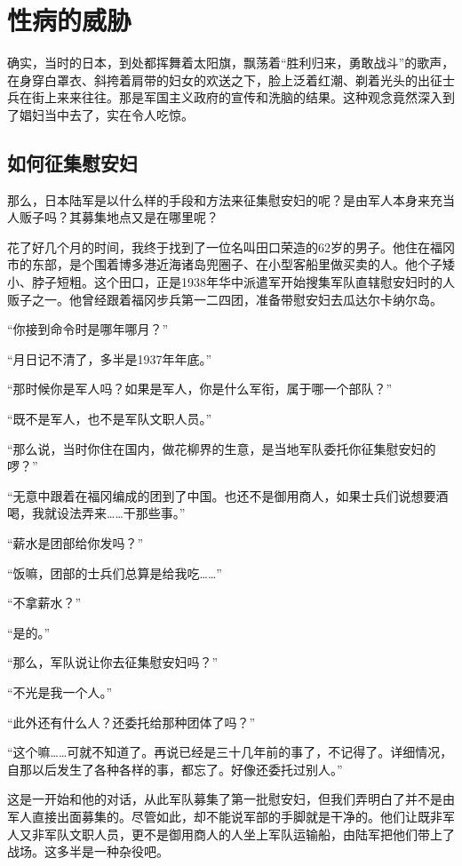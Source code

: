 \documentclass[12pt,UTF8]{ctexbook}
\begin{document}
\chapter{性病的威胁}

确实，当时的日本，到处都挥舞着太阳旗，飘荡着“胜利归来，勇敢战斗”的歌声，在身穿白罩衣、斜挎着肩带的妇女的欢送之下，脸上泛着红潮、剃着光头的出征士兵在街上来来往往。那是军国主义政府的宣传和洗脑的结果。这种观念竟然深入到了娼妇当中去了，实在令人吃惊。

\section{如何征集慰安妇}

那么，日本陆军是以什么样的手段和方法来征集慰安妇的呢？是由军人本身来充当人贩子吗？其募集地点又是在哪里呢？

花了好几个月的时间，我终于找到了一位名叫田口荣造的62岁的男子。他住在福冈市的东部，是个围着博多港近海诸岛兜圈子、在小型客船里做买卖的人。他个子矮小、脖子短粗。这个田口，正是1938年华中派遣军开始搜集军队直辖慰安妇时的人贩子之一。他曾经跟着福冈步兵第一二四团，准备带慰安妇去瓜达尔卡纳尔岛。

“你接到命令时是哪年哪月？”

“月日记不清了，多半是1937年年底。”

“那时候你是军人吗？如果是军人，你是什么军衔，属于哪一个部队？”

“既不是军人，也不是军队文职人员。”

“那么说，当时你住在国内，做花柳界的生意，是当地军队委托你征集慰安妇的啰？”

“无意中跟着在福冈编成的团到了中国。也还不是御用商人，如果士兵们说想要酒喝，我就设法弄来……干那些事。”

“薪水是团部给你发吗？”

“饭嘛，团部的士兵们总算是给我吃……”

“不拿薪水？”

“是的。”

“那么，军队说让你去征集慰安妇吗？”

“不光是我一个人。”

“此外还有什么人？还委托给那种团体了吗？”

“这个嘛……可就不知道了。再说已经是三十几年前的事了，不记得了。详细情况，自那以后发生了各种各样的事，都忘了。好像还委托过别人。”

这是一开始和他的对话，从此军队募集了第一批慰安妇，但我们弄明白了并不是由军人直接出面募集的。尽管如此，却不能说军部的手脚就是干净的。他们让既非军人又非军队文职人员，更不是御用商人的人坐上军队运输船，由陆军把他们带上了战场。这多半是一种杂役吧。
\end{document}
